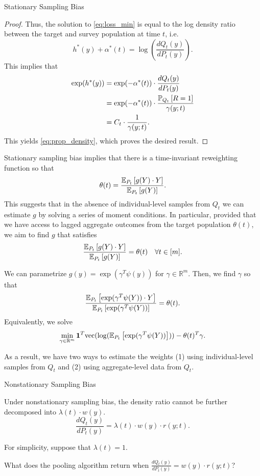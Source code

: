 \documentclass{article}
\theoremstyle{definition}
\theoremstyle{plain}
\theoremstyle{remark}
\begin{document}
\begin{section}{Stationary Sampling Bias}
\begin{proof}
Thus, the solution to \eqref{eq:loss_min} is equal to the log density ratio between the target and survey population at time $t$, i.e.
\[ h^{*}(y) + \alpha^{*}(t) = \log(\frac{dQ_{t}(y)}{dP_{t}(y)}).\]
This implies that
\begin{align*}
\exp(h^{*}(y)) &= \exp(- \alpha^{*}(t)) \cdot \frac{dQ_{t}(y)}{dP_{t}(y)} \\
&= \exp(- \alpha^{*}(t)) \cdot \frac{\PP[Q_{t}]{R=1}}{\gamma(y;t)} \\
&= C_{t} \cdot \frac{1}{\gamma(y;t)}.
\end{align*}
This yields \eqref{eq:prop_density}, which proves the desired result.
\end{proof}

Stationary sampling bias implies that there is a time-invariant reweighting function so that 
\[\theta(t) = \frac{\EE[P_{t}]{g(Y) \cdot Y}}{\EE[P_{t}]{g(Y)}}.\]
This suggests that in the absence of individual-level samples from $Q_{t}$ we can estimate $g$ by solving a series of moment conditions. In particular, provided that we have access to lagged aggregate outcomes from the target population $\theta(t)$, we aim to find $g$ that satisfies
\[ \frac{\EE[P_{t}]{g(Y) \cdot Y}}{\EE[P_{t}]{g(Y)}} = \theta(t) \quad \forall t \in [m].\]

We can parametrize $g(y) = \exp(\gamma^{T}\psi(y))$ for $\gamma \in \mathbb{R}^{m}$. Then, we find $\gamma$ so that
\[ \frac{\EE[P_{t}]{\exp(\gamma^{T}\psi(Y)) \cdot Y}}{\EE[P_{t}]{\exp(\gamma^{T} \psi(Y))}} = \theta(t).\]
Equivalently, we solve
\[ \min_{\gamma \in \mathbb{R}^{m}} \mathbf{1}^{T}\text{vec}(\log(\EE[P_{t}]{\exp(\gamma^{T} \psi(Y))}))- \theta(t)^{T}\gamma.\]

As a result, we have two ways to estimate the weights (1) using individual-level samples from $Q_{t}$ and (2) using aggregate-level data from $Q_{t}$.
\end{section}

\begin{section}{Nonstationary Sampling Bias}

Under nonstationary sampling bias, the density ratio cannot be further decomposed into $\lambda(t) \cdot w(y)$. 
\[ \frac{dQ_{t}(y)}{dP_{t}(y)} = \lambda(t) \cdot w(y) \cdot r(y;t).\]

For simplicity, suppose that $\lambda(t) = 1.$

What does the pooling algorithm return when $\frac{dQ_{t}(y)}{dP_{t}(y)} = w(y) \cdot r(y;t)$?



\end{section}
\end{document}
